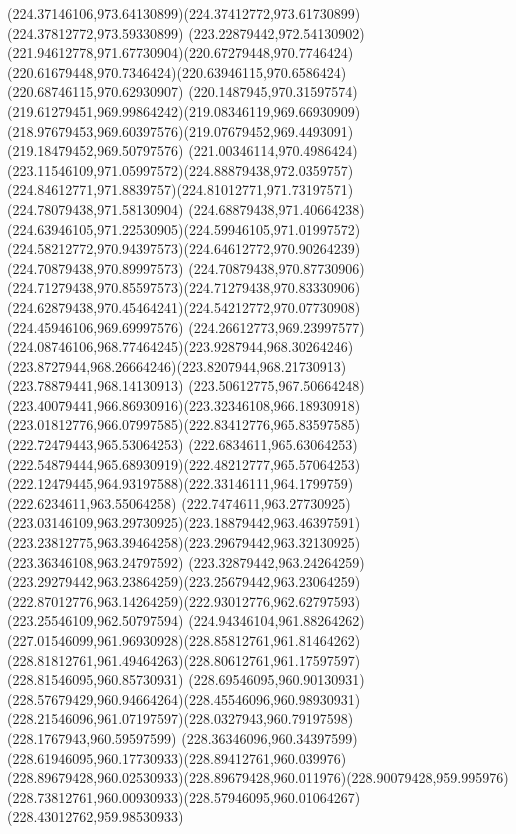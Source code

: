 {    \curveto(224.37146106,973.64130899)(224.37412772,973.61730899)(224.37812772,973.59330899)
    \curveto(223.22879442,972.54130902)(221.94612778,971.67730904)(220.67279448,970.7746424)
    \curveto(220.61679448,970.7346424)(220.63946115,970.6586424)(220.68746115,970.62930907)
    \curveto(220.1487945,970.31597574)(219.61279451,969.99864242)(219.08346119,969.66930909)
    \curveto(218.97679453,969.60397576)(219.07679452,969.4493091)(219.18479452,969.50797576)
    \curveto(221.00346114,970.4986424)(223.11546109,971.05997572)(224.88879438,972.0359757)
    \curveto(224.84612771,971.8839757)(224.81012771,971.73197571)(224.78079438,971.58130904)
    \curveto(224.68879438,971.40664238)(224.63946105,971.22530905)(224.59946105,971.01997572)
    \curveto(224.58212772,970.94397573)(224.64612772,970.90264239)(224.70879438,970.89997573)
    \curveto(224.70879438,970.87730906)(224.71279438,970.85597573)(224.71279438,970.83330906)
    \curveto(224.62879438,970.45464241)(224.54212772,970.07730908)(224.45946106,969.69997576)
    \curveto(224.26612773,969.23997577)(224.08746106,968.77464245)(223.9287944,968.30264246)
    \curveto(223.8727944,968.26664246)(223.8207944,968.21730913)(223.78879441,968.14130913)
    \curveto(223.50612775,967.50664248)(223.40079441,966.86930916)(223.32346108,966.18930918)
    \curveto(223.01812776,966.07997585)(222.83412776,965.83597585)(222.72479443,965.53064253)
    \curveto(222.6834611,965.63064253)(222.54879444,965.68930919)(222.48212777,965.57064253)
    \curveto(222.12479445,964.93197588)(222.33146111,964.1799759)(222.6234611,963.55064258)
    \curveto(222.7474611,963.27730925)(223.03146109,963.29730925)(223.18879442,963.46397591)
    \curveto(223.23812775,963.39464258)(223.29679442,963.32130925)(223.36346108,963.24797592)
    \curveto(223.32879442,963.24264259)(223.29279442,963.23864259)(223.25679442,963.23064259)
    \curveto(222.87012776,963.14264259)(222.93012776,962.62797593)(223.25546109,962.50797594)
    \curveto(224.94346104,961.88264262)(227.01546099,961.96930928)(228.85812761,961.81464262)
    \curveto(228.81812761,961.49464263)(228.80612761,961.17597597)(228.81546095,960.85730931)
    \curveto(228.69546095,960.90130931)(228.57679429,960.94664264)(228.45546096,960.98930931)
    \curveto(228.21546096,961.07197597)(228.0327943,960.79197598)(228.1767943,960.59597599)
    \curveto(228.36346096,960.34397599)(228.61946095,960.17730933)(228.89412761,960.039976)
    \curveto(228.89679428,960.02530933)(228.89679428,960.011976)(228.90079428,959.995976)
    \curveto(228.73812761,960.00930933)(228.57946095,960.01064267)(228.43012762,959.98530933)
}
